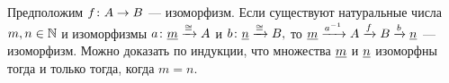 \documentclass[CT4S-EN-RU]{subfiles}
\begin{document}
\begin{proofRUS}
Предположим $f\colon A\rightarrow B$ — изоморфизм. Если существуют натуральные числа $m,n\in{\mathbb N}$ и изоморфизмы $a\colon\underline{m}\xrightarrow{\cong} A$ и $b\colon\underline{n}\xrightarrow{\cong} B,$ то $\ul{m}\To{a^\m1}A\To{f}B\To{b}\ul{n}$ — изоморфизм. Можно доказать по индукции, что множества $\underline{m}$ и $\underline{n}$ изоморфны тогда и только тогда, когда $m=n.$ 
\end{proofRUS}
\end{document}
